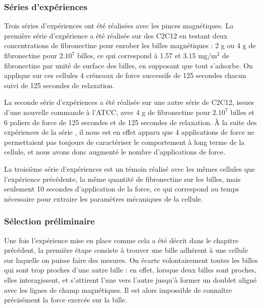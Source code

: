 \subsubsection{Séries d'expériences}

Trois séries d'expériences ont été réalisées avec les pinces magnétiques.
La première série d'expérience a été réalisée sur des C2C12 en testant deux concentrations de fibronectine pour enrober les billes magnétiques : 2 \micro g ou  4 \micro g de fibronectine pour $2.10^7$ billes, ce qui correspond à 1.57 et 3.15 mg/m$^2$ de fibronectine par unité de surface des billes, en supposant que tout s'adsorbe.  
On applique sur ces cellules 4 créneaux de force successifs de 125 secondes chacun suivi de 125 secondes de relaxation. 

La seconde série d'expériences a été réalisée sur une autre série de C2C12, issues d'une nouvelle commande à l'ATCC, avec 4 \micro g de fibronectine pour $2.10^7$ billes et 6 paliers de force de 125 secondes et de 125 secondes de relaxation. 
À la suite des expériences de la série , il nous est en effet apparu que 4 applications de force ne permettaient pas toujours de caractériser le comportement à long terme de la cellule, et nous avons donc augmenté le nombre d'applications de force. 

La troisième série d'expériences est un témoin réalisé avec les mêmes cellules que l'expérience précédente, la même quantité de fibronectine sur les billes, mais seulement 10 secondes d'application de la force, ce qui correspond au temps nécessaire pour extraire les paramètres mécaniques de la cellule. 




\subsubsection{Sélection préliminaire}

Une fois l'expérience mise en place comme cela a été décrit dans le chapitre précédent, la première étape consiste à trouver une bille adhérent à une cellule sur laquelle on puisse faire des mesures. 
On écarte volontairement toutes les billes qui sont trop proches d'une autre bille : en effet, lorsque deux billes sont proches, elles interagissent, et s'attirent l'une vers l'autre jusqu'à former un doublet aligné avec les lignes de champ magnétiques. Il est alors impossible de connaître précisément la force exercée sur la bille. 

